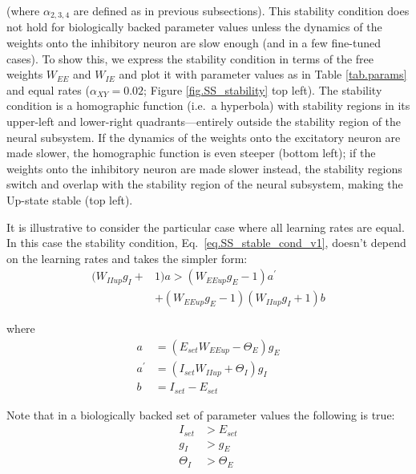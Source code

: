 \documentclass[twocolumn]{article}
\newcommand{\EE}{\mathit{EE}}
\newcommand{\IE}{\mathit{IE}}
\newcommand{\II}{\mathit{II}}
\newcommand{\XY}{\mathit{XY}}
\newcommand{\set}{\mathit{set}}
\newcommand{\up}{\mathit{up}}
\begin{document}
\noindent (where $\alpha_{2,3,4}$ are defined as in previous subsections). This stability condition does not hold for biologically backed parameter values unless the dynamics of the weights onto the inhibitory neuron are slow enough (and in a few fine-tuned cases). To show this, we express the stability condition in terms of the free weights $W_{\EE}$ and $W_{\IE}$ and plot it with parameter values as in Table \ref{tab.params} and equal rates ($\alpha_{\XY}=0.02$; Figure \ref{fig.SS_stability} top left). The stability condition is a homographic function (i.e.\ a hyperbola) with stability regions in its upper-left and lower-right quadrants---entirely outside the stability region of the neural subsystem. If the dynamics of the weights onto the excitatory neuron are made slower, the homographic function is even steeper (bottom left); if the weights onto the inhibitory neuron are made slower instead, the stability regions switch and overlap with the stability region of the neural subsystem, making the Up-state stable (top left).

It is illustrative to consider the particular case where all learning rates are equal. In this case the stability condition, Eq.\ \ref{eq.SS_stable_cond_v1}, doesn't depend on the learning rates and takes the simpler form:
\begin{equation}
\begin{aligned}
(W_{\II\up} g_I + & 1)a > (W_{\EE\up} g_E - 1)a^\prime \\
& + (W_{\EE\up} g_E - 1)(W_{\II\up} g_I + 1)b
\end{aligned}
\label{eq.SS_stable_cond_v2}
\end{equation}

\noindent where
\begin{displaymath}
\begin{aligned}
a & = (E_{\set} W_{\EE\up} - \Theta_E)g_E \\
a^\prime & = (I_{\set} W_{\II\up} + \Theta_I)g_I \\
b & = I_{\set} - E_{\set}
\end{aligned}
\end{displaymath}

\noindent Note that in a biologically backed set of parameter values the following is true:
\begin{displaymath}
\begin{aligned}
I_{\set} & > E_{\set} \\
g_I & > g_E \\
\Theta_I & > \Theta_E
\end{aligned}
\end{displaymath}
\end{document}
